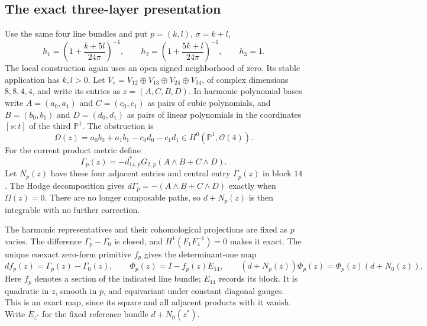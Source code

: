 \documentclass[11pt]{amsart}
\theoremstyle{definition}
\theoremstyle{remark}
\newcommand{\PP}{\mathbb P}
\newcommand{\cO}{\mathcal O}
\begin{document}
\subsection{The exact three-layer presentation}
Use the same four line bundles and put $p=(k,l)$, $\sigma=k+l$,
\begin{equation}\label{eq:diamond-polarization}
 h_1=\left(1+\frac{k+5l}{24\pi}\right)^{-1},\qquad
 h_2=\left(1+\frac{5k+l}{24\pi}\right)^{-1},\qquad h_3=1 .
\end{equation}
The local construction again uses an open signed neighborhood
of zero. Its stable application has $k,l>0$. Let
$V_\diamond=V_{12}\oplus V_{13}\oplus V_{24}\oplus V_{34}$,
of complex dimensions $8,8,4,4$, and write its entries as
$z=(A,C,B,D)$. In harmonic polynomial bases write
$A=(a_0,a_1)$ and $C=(c_0,c_1)$ as pairs of cubic polynomials,
and $B=(b_0,b_1)$ and $D=(d_0,d_1)$ as pairs of linear polynomials
in the coordinates $[s:t]$ of the third $\PP^1$.
The obstruction is
\begin{equation}\label{eq:diamond-obstruction}
 \Omega(z)=a_0b_0+a_1b_1-c_0d_0-c_1d_1\in H^0(\PP^1,\cO(4)).
\end{equation}
For the current product metric define
\[
 \Gamma_p(z)=-d_{14,p}^*G_{2,p}(A\wedge B+C\wedge D).
\]
Let $N_p(z)$ have these four adjacent entries and central entry
$\Gamma_p(z)$ in block $14$. The Hodge decomposition gives
$d\Gamma_p=-(A\wedge B+C\wedge D)$ exactly when $\Omega(z)=0$.
There are no longer composable paths, so $d+N_p(z)$ is then
integrable with no further correction.

The harmonic representatives and their cohomological projections
are fixed as $p$ varies. The difference $\Gamma_p-\Gamma_0$
is closed, and $H^1(F_1F_4^{-1})=0$ makes it exact. The unique
coexact zero-form primitive $f_p$ gives the determinant-one map
\begin{equation}\label{eq:diamond-hodge-map}
 df_p(z)=\Gamma_p(z)-\Gamma_0(z),\qquad
 \Phi_p(z)=I-f_p(z)E_{14},\qquad
 (d+N_p(z))\Phi_p(z)=\Phi_p(z)(d+N_0(z)).
\end{equation}
Here $f_p$ denotes a section of the indicated line bundle;
$E_{14}$ records its block. It is quadratic in $z$, smooth in $p$,
and equivariant under constant diagonal gauges. This is an exact
map, since its square and all adjacent products with it vanish.
Write $E_{z^*}$ for the fixed reference bundle $d+N_0(z^*)$.
\end{document}
